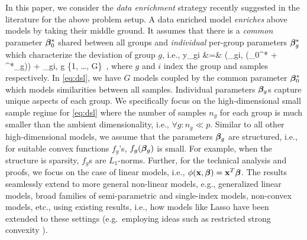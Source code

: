 In this paper, we consider the \emph{data enrichment} strategy recently suggested in the literature \cite{domu16, grti16,  olvi14, olvi15} for the above problem setup. 
A data enriched model \emph{enriches} above models by taking their middle ground. It assumes that there is a \emph{common} parameter $\boldsymbol{\beta}^*_0$ shared between all groups and \emph{individual} per-group parameters $\boldsymbol{\beta}_g^*$ which characterize the deviation of group $g$, i.e.,
\be
\label{eq:dsl}
y_{gi} &=& \phi(\x_{gi}, (\bbeta_0^* + \bbeta^*_g)) + \omega_{gi}, \quad g \in \{1, \dots, G\}~,
\ee
where $g$ and $i$ index the group and samples respectively. In \eqref{eq:dsl}, we have $G$ 
models coupled by the common parameter $\boldsymbol{\beta}^*_0$ which models similarities between all samples. Individual parameters $\boldsymbol{\beta}_g$s capture unique aspects of each group.
We specifically focus on the high-dimensional small sample regime for \eqref{eq:dsl} where the number of samples $n_g$ for each group is much smaller than the ambient 
dimensionality, i.e., $\forall g: n_g \ll p$. Similar to all other high-dimensional models, we assume that the parameters $\boldsymbol{\beta}_g$ are structured, i.e., for suitable convex functions $f_g$'s, $f_g(\boldsymbol{\beta}_g)$ is small.
For example, when the structure is sparsity, $f_g$s are $L_1$-norms. Further, for the technical analysis and proofs,
we focus on the case of linear models, i.e., $\phi(\mathbf{x},\boldsymbol{\beta}) = \mathbf{x}^T \boldsymbol{\beta}$. The results
seamlessly extend to more general non-linear models, e.g., generalized linear models, broad families of semi-parametric and single-index models, non-convex models, etc., using
existing results, i.e., how models like Lasso have been extended to these settings (e.g.~employing ideas such as restricted strong convexity \cite{negahban2012restricted}). {\color{red}{it is OK I think}}


